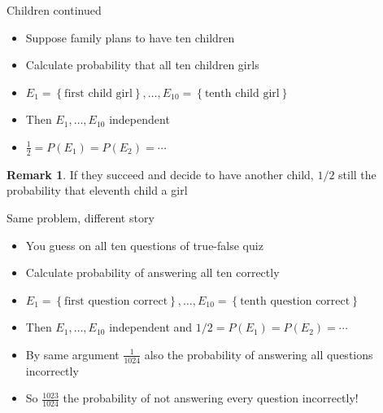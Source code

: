 \documentclass[handout]{beamer}
\theoremstyle{definition}
\newtheorem{remark}{Remark}
\begin{document}
\begin{frame}{Children continued}
\begin{itemize}
\item Suppose family plans to have \alert{ten} children
\item Calculate probability that all ten children girls
\item $E_1=\left\{\text{first child girl}\right\},\ldots,
E_{10}=\left\{\text{tenth child girl}\right\}$
\item Then $E_1,\ldots,E_{10}$ independent
\item $\frac{1}{2}=P\left(E_1\right)=P\left(E_2\right)=\cdots$
\end{itemize}
\begin{remark}
If they succeed and decide to have another child,
$1/2$ still the probability that eleventh child a girl
\end{remark}
\end{frame}

\begin{frame}{Same problem, different story}
\begin{itemize}
\item You guess on all ten questions of true-false quiz
\item Calculate probability of answering all ten correctly
\item $E_1=\left\{\text{first question correct}\right\},\ldots,
E_{10}=\left\{\text{tenth question correct}\right\}$
\item Then $E_1,\ldots,E_{10}$ independent
and $1/2=P\left(E_1\right)=P\left(E_2\right)=\cdots$
\item By same argument $\frac{1}{1024}$ also the probability
of answering all questions \alert{incorrectly}
\item So $\frac{1023}{1024}$ the probability of
\alert{not} answering every question incorrectly!
\end{itemize}
\end{frame}
\end{document}
